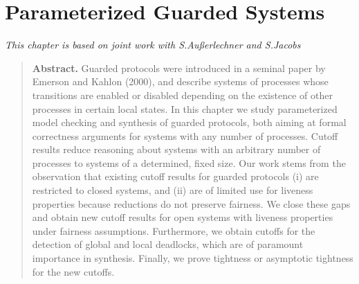 \chapter{Parameterized Guarded Systems} \label{chap:guarded-systems}
\hfill {\footnotesize\textit{This chapter is based on joint work with S.Au{\ss}erlechner and S.Jacobs~\cite{AJK16,SimonThesis}~~~~~~~~}}


\begin{quotation}
\noindent\textbf{Abstract.}
Guarded protocols were introduced in a seminal
paper by Emerson and Kahlon (2000), and describe systems of processes whose transitions
are enabled or disabled depending on the existence of other processes in
certain local states.
In this chapter we study parameterized model checking and synthesis of
guarded protocols, both aiming at formal correctness arguments for systems with any number of processes. 
Cutoff results reduce reasoning about systems with an arbitrary 
number of processes to systems of a determined, fixed size. Our work stems 
from the observation that existing cutoff results for guarded protocols
(i) are restricted to closed systems, and
(ii) are of limited use for liveness properties because reductions do not preserve fairness.
We close these gaps and obtain new cutoff results for open systems with liveness properties under
fairness assumptions.
Furthermore, we obtain cutoffs for the detection of global and local deadlocks,
which are of paramount importance in synthesis.
Finally, we prove tightness or asymptotic tightness for the new cutoffs.
\end{quotation}











%

